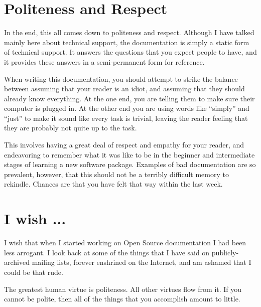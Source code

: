 \section*{Politeness and Respect}
In the end, this all comes down to politeness and respect. Although I have
talked mainly here about technical support, the documentation is simply a static
form of technical support. It answers the questions that you expect people to
have, and it provides these answers in a semi-permanent form for reference.

When writing this documentation, you should attempt to strike the balance
between assuming that your reader is an idiot, and assuming that they should
already know everything. At the one end, you are telling them to make sure their
computer is plugged in. At the other end you are using words like ``simply'' and
``just'' to make it sound like every task is trivial, leaving the reader feeling
that they are probably not quite up to the task.

This involves having a great deal of respect and empathy for your reader, and
endeavoring to remember what it was like to be in the beginner and intermediate
stages of learning a new software package. Examples of bad documentation are so
prevalent, however, that this should not be a terribly difficult memory to
rekindle. Chances are that you have felt that way within the last week.

\section*{I wish ...}
I wish that when I started working on Open Source documentation I had been less
arrogant. I look back at some of the things that I have said on
publicly-archived mailing lists, forever enshrined on the Internet, and am
ashamed that I could be that rude.

The greatest human virtue is politeness. All other virtues flow from it. If you
cannot be polite, then all of the things that you accomplish amount to little.
